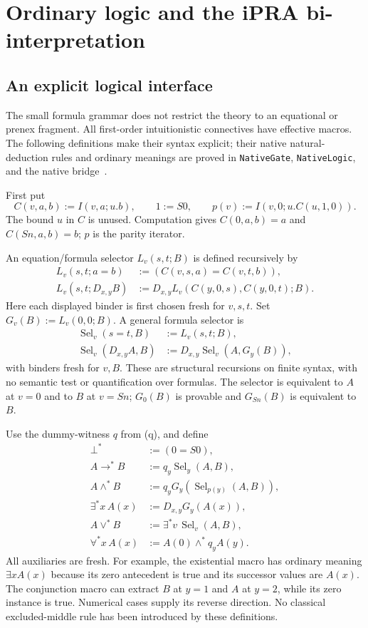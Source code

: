 \documentclass[11pt,letterpaper]{article}
\theoremstyle{definition}\newtheorem{definition}[theorem]{Definition}
\begin{document}
\section{Ordinary logic and the iPRA bi-interpretation}
\label{sec:bridge}

\subsection{An explicit logical interface}

The small formula grammar does not restrict the theory to an equational
or prenex fragment. All first-order intuitionistic connectives have
effective macros. The following definitions make their syntax explicit;
their native natural-deduction rules and ordinary meanings are proved in
\texttt{NativeGate}, \texttt{NativeLogic}, and the native bridge~\cite{logic,bridge}.

First put
\[
 C(v,a,b):=I(v,a;u.b),\qquad 1:=S0,\qquad
 p(v):=I(v,0;u.C(u,1,0)).
\]
The bound $u$ in $C$ is unused. Computation gives $C(0,a,b)=a$ and
$C(Sn,a,b)=b$; $p$ is the parity iterator.

An equation/formula selector $L_v(s,t;B)$ is defined recursively by
\begin{align*}
 L_v(s,t;a=b)&:=(C(v,s,a)=C(v,t,b)),\\
 L_v(s,t;D_{x,y}B)&:=D_{x,y}L_v(C(y,0,s),C(y,0,t);B).
\end{align*}
Here each displayed binder is first chosen fresh for $v,s,t$.
Set $G_v(B):=L_v(0,0;B)$. A general formula selector is
\begin{align*}
 \operatorname{Sel}_v(s=t,B)&:=L_v(s,t;B),\\
 \operatorname{Sel}_v(D_{x,y}A,B)&:=
       D_{x,y}\operatorname{Sel}_v(A,G_y(B)),
\end{align*}
with binders fresh for $v,B$. These are structural recursions on finite
syntax, with no semantic test or quantification over formulas. The selector
is equivalent to $A$ at $v=0$ and to $B$ at $v=Sn$; $G_0(B)$ is
provable and $G_{Sn}(B)$ is equivalent to $B$.

Use the dummy-witness $q$ from (q), and define
\begin{align*}
 \bot^*&:=(0=S0),\\
 A\mathbin{\to^*}B&:=q_y\operatorname{Sel}_y(A,B),\\
 A\mathbin{\land^*}B&:=q_yG_y(\operatorname{Sel}_{p(y)}(A,B)),\\
 \exists^*x\,A(x)&:=D_{x,y}G_y(A(x)),\\
 A\mathbin{\lor^*}B&:=\exists^*v\,\operatorname{Sel}_v(A,B),\\
 \forall^*x\,A(x)&:=A(0)\mathbin{\land^*}q_yA(y).
\end{align*}
All auxiliaries are fresh. For example, the existential macro has ordinary
meaning $\exists x A(x)$ because its zero antecedent is true and its
successor values are $A(x)$. The conjunction macro can extract $B$ at
$y=1$ and $A$ at $y=2$, while its zero instance is true. Numerical cases
supply its reverse direction. No classical excluded-middle rule has been
introduced by these definitions.
\end{document}
